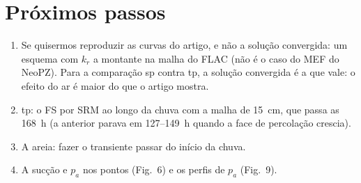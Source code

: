\documentclass[11pt,a4paper]{article}
\begin{document}
\section{Próximos passos}
\begin{enumerate}
  \item Se quisermos reproduzir as curvas do artigo, e não a solução convergida: um esquema com $k_r$ a montante na
    malha do FLAC (não é o caso do MEF do NeoPZ). Para a comparação sp contra tp, a solução convergida é a que vale:
    o efeito do ar é maior do que o artigo mostra.
  \item tp: o FS por SRM ao longo da chuva com a malha de 15~cm, que passa as 168~h (a anterior parava em
    127--149~h quando a face de percolação crescia).
  \item A areia: fazer o transiente passar do início da chuva.
  \item A sucção e $p_a$ nos pontos (Fig.~6) e os perfis de $p_a$ (Fig.~9).
\end{enumerate}
\end{document}
